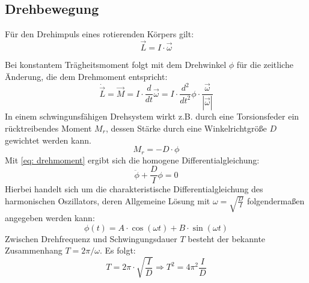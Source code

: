 \subsection{Drehbewegung}
Für den Drehimpuls eines rotierenden Körpers gilt:
\begin{equation}
 \vec{L} = I \cdot \vec{\omega}
\end{equation}

Bei konstantem Trägheitsmoment folgt mit dem Drehwinkel $\phi$ für die zeitliche Änderung, die dem Drehmoment
entspricht:
\begin{equation}
  \dot{\vec{L}} = \vec{M} = I \cdot \frac{d}{dt}\vec{\omega} =
  I \cdot \frac{d^2}{dt^2} \phi \cdot \frac{\vec{\omega}}{|\vec{\omega}|}
  \label{eq: drehmoment}
\end{equation}
In einem schwingunsfähigen Drehsystem wirkt z.B. durch eine Torsionsfeder ein
rücktreibendes Moment $M_{r}$, dessen Stärke durch eine Winkelrichtgröße $D$ gewichtet
werden kann.
\begin{equation}
  M_{r} = - D \cdot \phi
\end{equation}
Mit \eqref{eq: drehmoment} ergibt sich die homogene Differentialgleichung:
\begin{equation}
  \ddot{\phi} + \frac{D}{I}\phi = 0
\end{equation}
Hierbei handelt sich um die charakteristische Differentialgleichung des harmonischen
Oszillators, deren Allgemeine Lösung mit $\omega = \sqrt{\frac{D}{I}}$ folgendermaßen angegeben werden kann:
\begin{equation}
  \phi(t) = A\cdot \cos(\omega t) + B \cdot \sin(\omega t)
\end{equation}
Zwischen Drehfrequenz und Schwingungsdauer $T$ besteht der bekannte Zusammenhang
$T = 2\pi / \omega$. Es folgt:
\begin{equation}
  T = 2\pi \cdot \sqrt{\frac{I}{D}} \Rightarrow T^2 = 4\pi^2 \frac{I}{D}
\end{equation}

